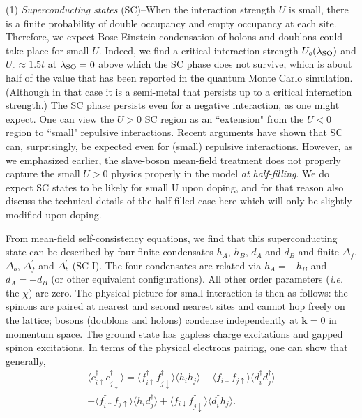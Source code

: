 \documentclass[aps,prb,twocolumn,superscriptaddress,showpacs]{revtex4-1}
\begin{document}
(1) {\it Superconducting states} (SC)--When the interaction strength $U$ is small, there is a finite probability of double occupancy and empty occupancy at each site. Therefore, we expect Bose-Einstein condensation of holons and doublons could take place for small $U$. Indeed, we find a critical interaction strength $U_c(\lambda_{\rm{SO}})$ and $U_c \approx 1.5t$ at $\lambda_{\rm{SO}}=0$ above which the SC phase does not survive, which is about half of the value that has been reported in the quantum Monte Carlo simulation.\cite{Meng:nat10} (Although in that case it is a semi-metal that persists up to a critical interaction strength.) The SC phase persists even for a negative interaction, as one might expect.  One can view the $U>0$ SC region as an ``extension" from the $U<0$ region to ``small" repulsive interactions.  Recent arguments have shown that SC can, surprisingly, be expected even for (small) repulsive interactions.\cite{Raghu:prb11}  However, as we emphasized earlier, the slave-boson mean-field treatment does not properly capture the small $U>0$ physics properly in the model {\em at half-filling}.   We do expect SC states to be likely for small U upon doping, and for that reason also discuss the technical details of the half-filled case here which will only be slightly modified upon doping.

From mean-field self-consistency equations, we find that this superconducting state can be described by four finite condensates $h_A$, $h_B$, $d_A$ and $d_B$ and finite $\Delta_f$, $\Delta_b$, $\Delta_f^{\prime}$ and $\Delta_b^{\prime}$ (SC I). The four condensates are related via $h_A=-h_B$ and $d_A=-d_B$ (or other equivalent configurations). All other order parameters ({\it i.e.} the $\chi$) are zero. The physical picture for small interaction is then as follows: the spinons are paired at nearest and second nearest sites and cannot hop freely on the lattice; bosons (doublons and holons) condense independently at $\textbf{k}=0$ in momentum space. The ground state has gapless charge excitations and gapped spinon excitations. In terms of the physical electrons pairing, one can show that generally,
\begin{eqnarray}
\langle c^{\dag}_{i\uparrow} c^{\dag}_{j\downarrow} \rangle
=\langle f_{i\uparrow}^{\dag}f_{j\downarrow}^{\dag} \rangle \langle h_{i}h_{j} \rangle - \langle f_{i\downarrow}f_{j\uparrow}\rangle \langle d_{i}^{\dag}d_{j}^{\dag} \rangle \nonumber \\ -\langle f_{i\uparrow}^{\dag}f_{j\uparrow} \rangle \langle h_{i}d_{j}^{\dag} \rangle + \langle f_{i\downarrow}f^{\dag}_{j\downarrow} \rangle \langle d_{i}^{\dag}h_{j}\rangle.
\end{eqnarray}
\end{document}
